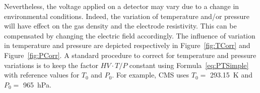 	Nevertheless, the voltage applied on a detector may vary due to a change in environmental conditions. Indeed, the variation of temperature and/or pressure will have effect on the gas density and the electrode resistivity. This can be compensated by changing the electric field accordingly. The influence of variation in temperature and pressure are depicted respectively in Figure~\ref{fig:TCorr} and Figure~\ref{fig:PCorr}. A standard procedure to correct for temperature and pressure variations is to keep the factor $HV\cdot T/P$ constant using Formula~\ref{eq:PTSimple}~\cite{ABBRESCIA1995,ABBRESCIA1997PRES} with reference values for $T_0$ and $P_0$. For example, CMS uses $T_0=$ \SI{293.15}{K} and $P_0=$ \SI{965}{hPa}.
	
\endgroup
	
\begingroup\setlength{\intextsep}{0pt}\setlength{\columnsep}{10pt}
	
